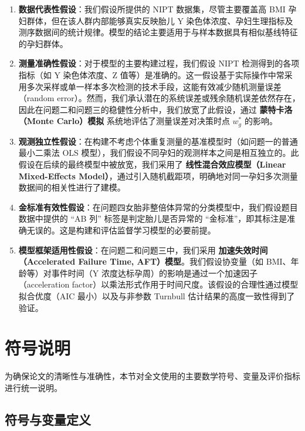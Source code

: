 \documentclass[withoutpreface]{cumcmthesis}
\begin{document}
\begin{enumerate}
    \item \textbf{数据代表性假设}：我们假设所提供的 NIPT 数据集，尽管主要覆盖高 BMI 孕妇群体，但在该人群内部能够真实反映胎儿 Y 染色体浓度、孕妇生理指标及测序数据间的统计规律。模型的结论主要适用于与样本数据具有相似基线特征的孕妇群体。
    
    \item \textbf{测量准确性假设}：对于模型的主要构建过程，我们假设 NIPT 检测得到的各项指标（如 Y 染色体浓度、Z 值等）是准确的。这一假设基于实际操作中常采用多次采样或单一样本多次检测的技术手段，这能有效减少随机测量误差（random error）。然而，我们承认潜在的系统误差或残余随机误差依然存在，因此在问题二和问题三的稳健性分析中，我们放宽了此假设，通过 \textbf{蒙特卡洛（Monte Carlo）模拟} 系统地评估了测量误差对决策时点 $w_g^*$ 的影响。
    
    \item \textbf{观测独立性假设}：在构建不考虑个体重复测量的基准模型时（如问题一的普通最小二乘法 OLS 模型），我们假设不同孕妇的观测样本之间是相互独立的。此假设在后续的最终模型中被放宽，我们采用了 \textbf{线性混合效应模型（Linear Mixed-Effects Model）}，通过引入随机截距项，明确地对同一孕妇多次测量数据间的相关性进行了建模。
    
    \item \textbf{金标准有效性假设}：在问题四女胎非整倍体异常的分类模型中，我们假设题目数据中提供的 “AB 列” 标签是判定胎儿是否异常的 “金标准”，即其标注是准确无误的。这是构建和评估监督学习模型的必要前提。
    
    \item \textbf{模型框架适用性假设}：在问题二和问题三中，我们采用 \textbf{加速失效时间（Accelerated Failure Time, AFT）模型}。我们假设协变量（如 BMI、年龄等）对事件时间（Y 浓度达标孕周）的影响是通过一个加速因子（acceleration factor）以乘法形式作用于时间尺度。该假设的合理性通过模型拟合优度（AIC 最小）以及与非参数 Turnbull 估计结果的高度一致性得到了验证。
\end{enumerate}

\section{符号说明}

为确保论文的清晰性与准确性，本节对全文使用的主要数学符号、变量及评价指标进行统一说明。

\subsection{符号与变量定义}
\end{document}
